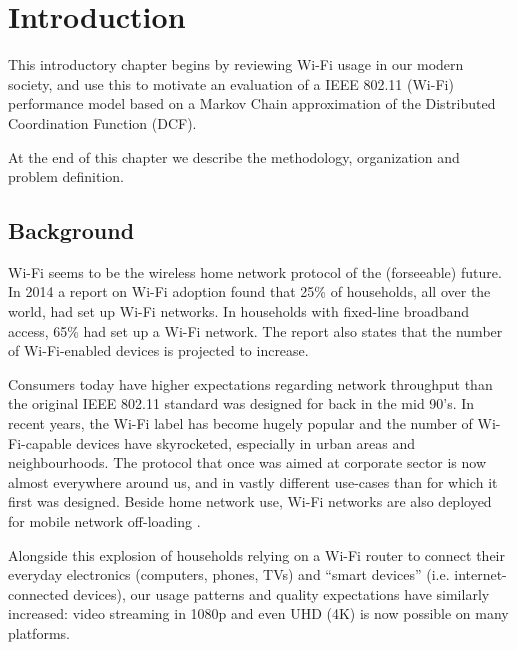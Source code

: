 
\chapter{Introduction}

This introductory chapter begins by reviewing Wi-Fi usage in our modern society, and use this to motivate an evaluation of a IEEE 802.11 (Wi-Fi) performance model based on a Markov Chain approximation of the Distributed Coordination Function (DCF). 

At the end of this chapter we describe the methodology, organization and problem definition.

\section{Background}


Wi-Fi seems to be the wireless home network protocol of the (forseeable)
future. In 2014 a report on Wi-Fi adoption found that 25\% of households, all
over the world, had set up Wi-Fi networks. In households with fixed-line
broadband access, 65\% had set up a Wi-Fi network\cite{smith}. The report also
states that the number of Wi-Fi-enabled devices is projected to increase.

Consumers today have higher expectations regarding network throughput than the
original IEEE 802.11 standard was designed for back in the mid 90's. In recent years,
the Wi-Fi label has become hugely popular and the number of Wi-Fi-capable
devices have skyrocketed, especially in urban areas and neighbourhoods. The
protocol that once was aimed at corporate sector is now almost everywhere
around us, and in vastly different use-cases than for which it first was designed.
Beside home network use, Wi-Fi networks are also deployed for mobile network
off-loading \cite{offloading}.

Alongside this explosion of households relying on a Wi-Fi router to connect
their everyday electronics (computers, phones, TVs) and ``smart devices''
(i.e. internet-connected devices), our usage patterns and quality expectations
have similarly increased: video streaming in 1080p and even UHD (4K) is now
possible on many platforms.

